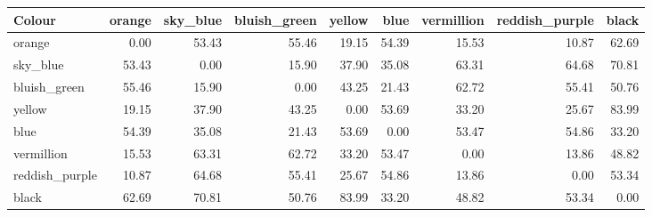 \begin{tabular}{lrrrrrrrr}
\toprule
Colour & orange & sky\_blue & bluish\_green & yellow & blue & vermillion & reddish\_purple & black \\
\midrule
orange & 0.00 & 53.43 & 55.46 & 19.15 & 54.39 & 15.53 & 10.87 & 62.69 \\
sky\_blue & 53.43 & 0.00 & 15.90 & 37.90 & 35.08 & 63.31 & 64.68 & 70.81 \\
bluish\_green & 55.46 & 15.90 & 0.00 & 43.25 & 21.43 & 62.72 & 55.41 & 50.76 \\
yellow & 19.15 & 37.90 & 43.25 & 0.00 & 53.69 & 33.20 & 25.67 & 83.99 \\
blue & 54.39 & 35.08 & 21.43 & 53.69 & 0.00 & 53.47 & 54.86 & 33.20 \\
vermillion & 15.53 & 63.31 & 62.72 & 33.20 & 53.47 & 0.00 & 13.86 & 48.82 \\
reddish\_purple & 10.87 & 64.68 & 55.41 & 25.67 & 54.86 & 13.86 & 0.00 & 53.34 \\
black & 62.69 & 70.81 & 50.76 & 83.99 & 33.20 & 48.82 & 53.34 & 0.00 \\
\bottomrule
\end{tabular}
